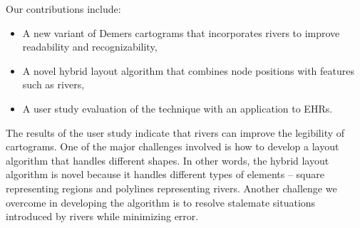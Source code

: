 Our contributions include:

\begin{itemize}
    \item A new variant of Demers cartograms that incorporates rivers to improve readability and recognizability,
    \item A novel hybrid layout algorithm that combines node positions with features such as rivers,
    \item A user study evaluation of the technique with an application to EHRs.
\end{itemize}

The results of the user study indicate that rivers can improve the legibility of cartograms. One of the major challenges involved is how to develop a layout algorithm that handles different shapes. In other words, the hybrid layout algorithm is novel because it handles different types of elements -- square representing regions and polylines representing rivers. Another challenge we overcome in developing the algorithm is to resolve stalemate situations introduced by rivers while minimizing error.